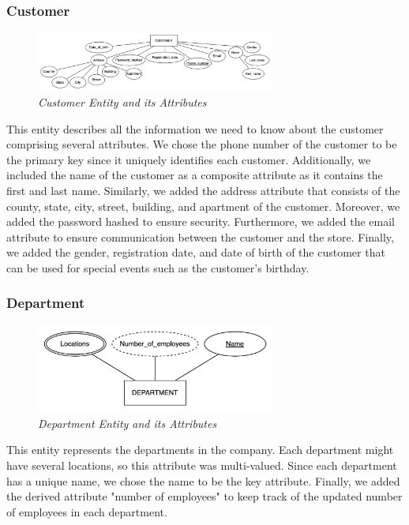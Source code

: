 \subsubsection{Customer}
\begin{figure}[H]
  \centering
  \includegraphics[width=0.7\textwidth]{images/entities/customer.png}
  \caption{\textit{Customer Entity and its Attributes}}
\end{figure}

This entity describes all the information we need to know about the customer comprising several attributes. We chose the phone number of the customer to be the primary key since it uniquely identifies each customer. Additionally, we included the name of the customer as a composite attribute as it contains the first and last name. Similarly, we added the address attribute that consists of the county, state, city, street, building, and apartment of the customer. Moreover, we added the password hashed to ensure security. Furthermore, we added the email attribute to ensure communication between the customer and the store. Finally, we added the gender, registration date, and date of birth of the customer that can be used for special events such as the customer's birthday.

\subsubsection{Department}
\begin{figure}[H]
  \centering
  \includegraphics[width=0.7\textwidth]{images/entities/department.png}
  \caption{\textit{Department Entity and its Attributes}}
\end{figure}

This entity represents the departments in the company. Each department might have several locations, so this attribute was multi-valued. Since each department has a unique name, we chose the name to be the key attribute. Finally, we added the derived attribute "number of employees" to keep track of the updated number of employees in each department.

